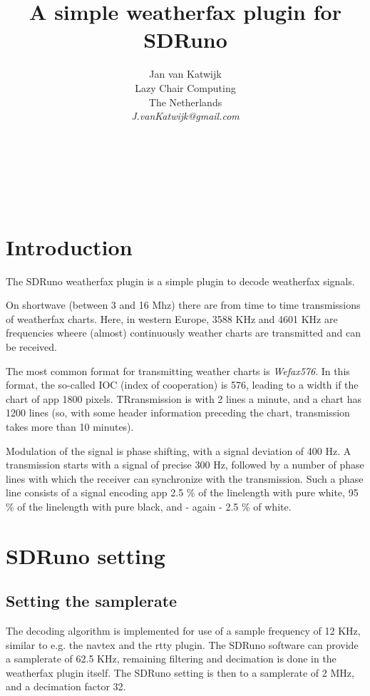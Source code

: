 \documentclass[11pt]{article}
\begin{document}
\title{A simple weatherfax plugin for SDRuno}
\author{
Jan van Katwijk\\
Lazy Chair Computing \\
The Netherlands\\
{\em J.vanKatwijk@gmail.com}}
\maketitle
\ \\
\ \\
\ \\
\section{Introduction}
The SDRuno weatherfax plugin is a simple plugin to decode weatherfax signals.

On shortwave (between 3 and 16 Mhz) there are from time to time
transmissions of weatherfax charts.
Here, in western Europe, 3588 KHz and 4601 KHz are frequencies wheere
(almost) continuously weather charts are transmitted and can be received.

The most common format for transmitting weather charts is
{\em Wefax576}. In this format, the so-called IOC
(index of cooperation) is 576, leading to a width if the chart of
app 1800 pixels.
TRransmission is with 2 lines a minute, and a chart has 1200 lines
(so, with some header information preceding the chart, transmission
takes more than 10 minutes).

Modulation of the signal is phase shifting, with a signal deviation of
400 Hz. 
A transmission starts with a signal of precise 300 Hz, followed by
a number of phase lines with which the receiver can synchronize
with the transmission.
Such a phase line consists of a signal encoding app 2.5 \% of the linelength
with pure white, 95 \% of the linelength with pure black, and - again -
2.5 \% of white.

\section{SDRuno setting}
\subsection{Setting the samplerate}
The decoding  algorithm is implemented for use of
a sample frequency of 12 KHz, similar to e.g. the navtex and
the rtty plugin. The SDRuno software can provide a samplerate
of 62.5 KHz, remaining filtering and decimation is done in
the weatherfax plugin itself.
The SDRuno setting is then to a samplerate of 2 MHz, and a decimation factor
32.
\end{document}

